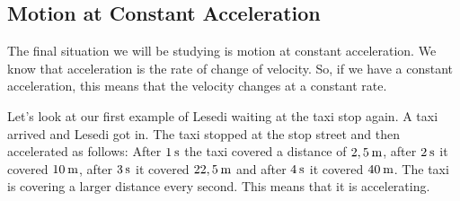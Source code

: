             \subsection*{Motion at Constant Acceleration}
            \nopagebreak
        \label{m38795*id71822}The final situation we will be studying is motion at constant acceleration. We know that acceleration is the rate of change of velocity. So, if we have a constant acceleration, this means that the velocity changes at a constant rate.\par 
        \label{m38795*id71827}Let's look at our first example of Lesedi waiting at the taxi stop again. A taxi arrived and Lesedi got in. The taxi stopped at the stop street and then accelerated as follows: After $1\phantom{\rule{2pt}{0ex}}\text{s}$ the taxi covered a distance of $2,5\phantom{\rule{2pt}{0ex}}\text{m}$, after $2\phantom{\rule{2pt}{0ex}}\text{s}$ it covered $10\phantom{\rule{2pt}{0ex}}\text{m}$, after $3\phantom{\rule{2pt}{0ex}}\text{s}$ it covered $22,5\phantom{\rule{2pt}{0ex}}\text{m}$ and after $4\phantom{\rule{2pt}{0ex}}\text{s}$ it covered $40\phantom{\rule{2pt}{0ex}}\text{m}$. The taxi is covering a larger distance every second. This means that it is accelerating.\par 
    \setcounter{subfigure}{0}
